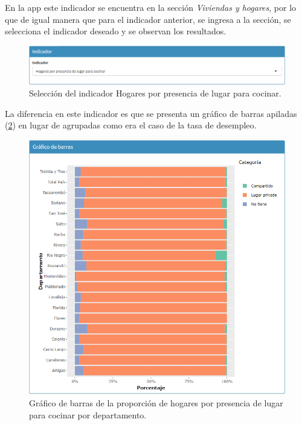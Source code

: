 \documentclass[12pt,twoside,spanish,a4paper]{book}\usepackage[]{graphicx}\usepackage[]{color}
\begin{document}
En la app este indicador se encuentra en la sección \textit{Viviendas y hogares}, por lo que de igual manera que para el indicador anterior, se ingresa a la sección, se selecciona el indicador deseado y se observan los resultados.

\begin{figure}[htb]
\begin{center}
\includegraphics[width=1\textwidth]{img/indicador_hog.PNG}
\caption{Selección del indicador Hogares por presencia de lugar para cocinar. \label{ind2}}
\end{center}
\end{figure}

La diferencia en este indicador es que se presenta un gráfico de barras apiladas (\ref{barras2}) en lugar de agrupadas como era el caso de la tasa de desempleo.

\begin{figure}[htb]
\begin{center}
\includegraphics[width=1\textwidth]{img/Barras_hog.PNG}
\caption{Gráfico de barras de la proporción de hogares por presencia de lugar para cocinar por departamento. \label{barras2}}
\end{center}
\end{figure}
\end{document}

